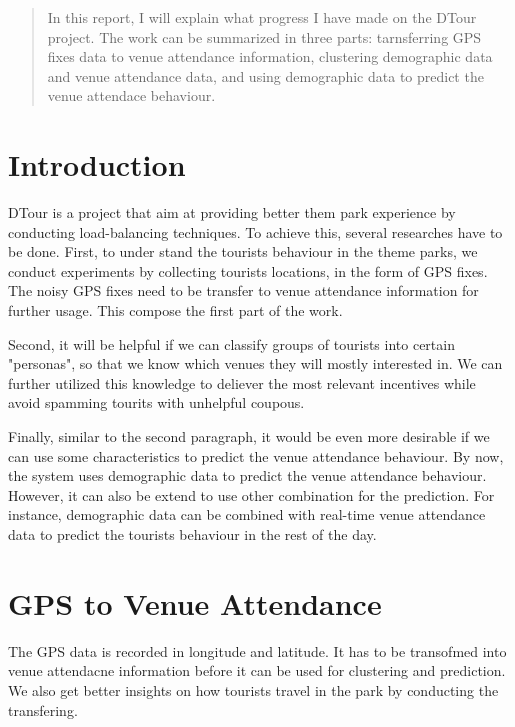 \documentclass[12pt]{article}
\begin{document}
\maketitle

\begin{abstract}

In this report, I will explain what progress I have made on the DTour project. The work can be summarized in three parts: tarnsferring GPS fixes data to venue attendance information, clustering demographic data and venue attendance data, and using demographic data to predict the venue attendace behaviour.
\end{abstract}

\section{Introduction}

DTour is a project that aim at providing better them park experience by conducting load-balancing techniques. To achieve this, several researches have to be done. First, to under stand the tourists behaviour in the theme parks, we conduct experiments by collecting tourists locations, in the form of GPS fixes. The noisy GPS fixes need to be transfer to venue attendance information for further usage. This compose the first part of the work.

Second, it will be helpful if we can classify groups of tourists into certain "personas", so that we know which venues they will mostly interested in. We can further utilized this knowledge to deliever the most relevant incentives while avoid spamming tourits with unhelpful coupous.

Finally, similar to the second paragraph, it would be even more desirable if we can use some characteristics to predict the venue attendance behaviour. By now, the system uses demographic data to predict the venue attendance behaviour. However, it can also be extend to use other combination for the prediction. For instance, demographic data can be combined with real-time venue attendance data to predict the tourists behaviour in the rest of the day.

\section{GPS to Venue Attendance}\label{gps_venue}

The GPS data is recorded in longitude and latitude. It has to be transofmed into venue attendacne information before it can be used for clustering and prediction. We also get better insights on how tourists travel in the park by conducting the transfering.
\end{document}

